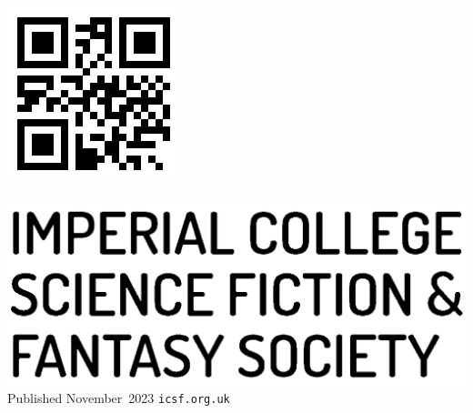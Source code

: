 \begin{minipage}{\textwidth}
\begin{minipage}[h]{7.8em}
\includegraphics[height=\textwidth]{img/info/qr-small.png}
\end{minipage}%
\hspace{1.5em}%
\begin{minipage}[h]{12em}
\raggedright
\includegraphics[width=\textwidth]{img/logo/logo-text.png}
Published November~2023
\texttt{icsf.org.uk}
\end{minipage}
\hspace*{\fill}%
\end{minipage}
